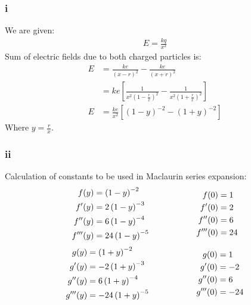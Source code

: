 \documentclass[11pt]{article}
\numberwithin{equation}{section}
\begin{document}
\subsubsection*{i}
We are given:
\begin{align}
E = \frac{kq}{x^2}
\end{align}
Sum of electric fields due to both charged particles is:
\begin{align}
	E &= \frac{ke}{\left( x-r \right)^2} - \frac{ke}{\left( x+r \right)^2}\\
	&= ke \left[ \frac{1}{x^2\left( 1 - \frac{r}{x} \right)^2} - \frac{1}{x^2\left( 1 + \frac{r}{x} \right)^2} \right]\\
	E&= \frac{ke}{x^2} \left[ \left( 1- y \right)^{-2} - \left( 1 + y\right)^{-2} \right]
\end{align}
Where $y =\frac{r}{x}$.
\subsubsection*{ii}
Calculation of constants to be used in Maclaurin series expansion:
\begin{equation*}
	\begin{aligned}[c]
		f(y) &= \left( 1 - y \right)^{-2}\\
		f'(y) &= 2\left(1-y\right)^{-3}\\
		f''(y) &= 6\left(1-y\right)^{-4}\\
		f'''(y) &= 24\left(1-y\right)^{-5}
	\end{aligned}
	\makebox[2cm]{}
	\begin{aligned}[c]
		f(0) &= 1\\
		f'(0) &= 2\\
		f''(0) &= 6\\
		f'''(0) &= 24\\
	\end{aligned}
\end{equation*}
\begin{equation*}
	\begin{aligned}[c]
		g(y) &= \left( 1 + y \right)^{-2}\\
		g'(y) &= -2\left(1+y\right)^{-3}\\
		g''(y) &= 6\left(1+y\right)^{-4}\\
		g'''(y) &= -24\left(1+y\right)^{-5}
	\end{aligned}
	\makebox[2cm]{}
	\begin{aligned}[c]
		g(0) &= 1\\
		g'(0) &= -2\\
		g''(0) &= 6\\
		g'''(0) &= -24\\
	\end{aligned}
\end{equation*}
\end{document}
